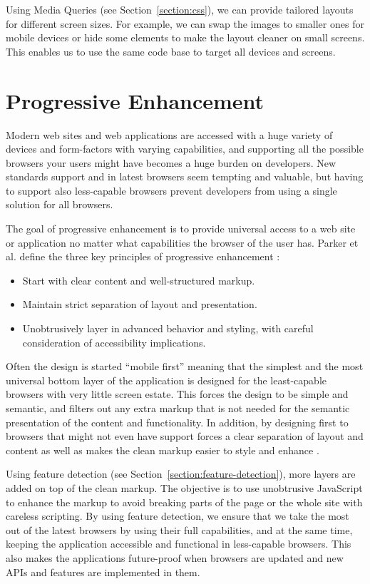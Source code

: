 Using Media Queries (see Section~\ref{section:css}), we can provide
tailored layouts for different screen sizes. For example, we can swap
the images to smaller ones for mobile devices or hide some elements to
make the layout cleaner on small screens. This enables us to use the
same code base to target all devices and screens.

\section{Progressive Enhancement}
\label{subsection:progressive-enhancement}

Modern web sites and web applications are accessed with a huge variety
of devices and form-factors with varying capabilities, and supporting
all the possible browsers your users might have becomes a huge burden
on developers. New standards support and  in latest
browsers seem tempting and valuable, but having to support also
less-capable browsers prevent developers from using a single solution
for all browsers.

The goal of progressive enhancement is to provide universal access to
a web site or application no matter what capabilities the browser of
the user has. Parker et al. define the three key principles of
progressive enhancement \cite{parker2010designing}:

\begin{itemize}
\item Start with clear content and well-structured markup.
\item Maintain strict separation of layout and presentation.
\item Unobtrusively layer in advanced behavior and styling, with
  careful consideration of accessibility implications.
\end{itemize}

Often the design is started ``mobile first'' meaning that the simplest
and the most universal bottom layer of the application is designed for
the least-capable browsers with very little screen estate. This forces
the design to be simple and semantic, and filters out any extra markup
that is not needed for the semantic presentation of the content and
functionality. In addition, by designing first to browsers that might
not even have  support forces a clear separation of layout
and content as well as makes the clean markup easier to style and
enhance \cite{parker2010designing}.

Using feature detection (see Section~\ref{section:feature-detection}),
more layers are added on top of the clean markup. The objective is to
use unobtrusive JavaScript to enhance the markup to avoid breaking
parts of the page or the whole site with careless scripting. By using
feature detection, we ensure that we take the most out of the latest
browsers by using their full capabilities, and at the same time,
keeping the application accessible and functional in less-capable
browsers. This also makes the applications future-proof when browsers
are updated and new APIs and features are implemented in
them. \cite{parker2010designing}

